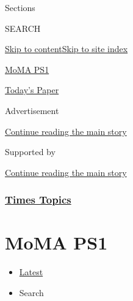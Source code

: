 Sections

SEARCH

\protect\hyperlink{site-content}{Skip to
content}\protect\hyperlink{site-index}{Skip to site index}

\href{https://www.nytimes3xbfgragh.onion/topic/organization/moma-ps1}{MoMA
PS1}

\href{https://myaccount.nytimes3xbfgragh.onion/auth/login?response_type=cookie\&client_id=vi}{}

\href{https://www.nytimes3xbfgragh.onion/section/todayspaper}{Today's
Paper}

Advertisement

\protect\hyperlink{after-top}{Continue reading the main story}

Supported by

\protect\hyperlink{after-sponsor}{Continue reading the main story}

\hypertarget{times-topics}{%
\subsubsection{\texorpdfstring{\href{/index.html}{Times
Topics}}{Times Topics}}\label{times-topics}}

\hypertarget{moma-ps1}{%
\section{MoMA PS1}\label{moma-ps1}}

\begin{itemize}
\tightlist
\item
  \protect\hyperlink{stream-panel}{Latest}
\item
  Search
\end{itemize}

